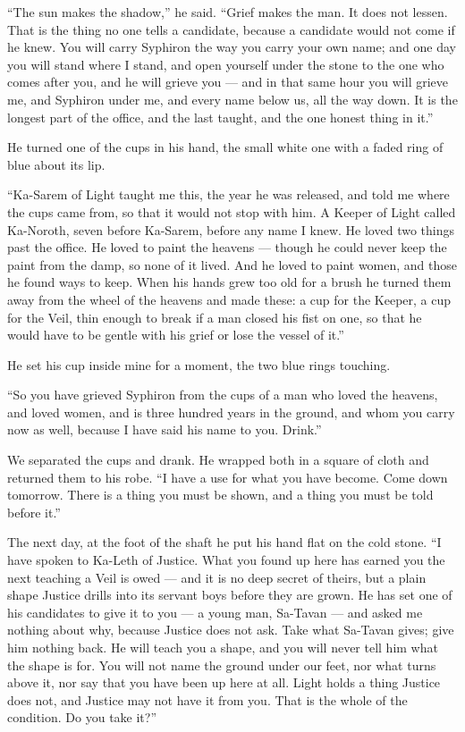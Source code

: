 ``The sun makes the shadow,'' he said. ``Grief makes the man. It does not lessen. That is the thing no one tells a candidate, because a candidate would not come if he knew. You will carry Syphiron the way you carry your own name; and one day you will stand where I stand, and open yourself under the stone to the one who comes after you, and he will grieve you --- and in that same hour you will grieve me, and Syphiron under me, and every name below us, all the way down. It is the longest part of the office, and the last taught, and the one honest thing in it.''\par

He turned one of the cups in his hand, the small white one with a faded ring of blue about its lip.\par

``Ka-Sarem of Light taught me this, the year he was released, and told me where the cups came from, so that it would not stop with him. A Keeper of Light called Ka-Noroth, seven before Ka-Sarem, before any name I knew. He loved two things past the office. He loved to paint the heavens --- though he could never keep the paint from the damp, so none of it lived. And he loved to paint women, and those he found ways to keep. When his hands grew too old for a brush he turned them away from the wheel of the heavens and made these: a cup for the Keeper, a cup for the Veil, thin enough to break if a man closed his fist on one, so that he would have to be gentle with his grief or lose the vessel of it.''\par

He set his cup inside mine for a moment, the two blue rings touching.\par

``So you have grieved Syphiron from the cups of a man who loved the heavens, and loved women, and is three hundred years in the ground, and whom you carry now as well, because I have said his name to you. Drink.''\par

We separated the cups and drank. He wrapped both in a square of cloth and returned them to his robe. ``I have a use for what you have become. Come down tomorrow. There is a thing you must be shown, and a thing you must be told before it.''\par

The next day, at the foot of the shaft he put his hand flat on the cold stone. ``I have spoken to Ka-Leth of Justice. What you found up here has earned you the next teaching a Veil is owed --- and it is no deep secret of theirs, but a plain shape Justice drills into its servant boys before they are grown. He has set one of his candidates to give it to you --- a young man, Sa-Tavan --- and asked me nothing about why, because Justice does not ask. Take what Sa-Tavan gives; give him nothing back. He will teach you a shape, and you will never tell him what the shape is for. You will not name the ground under our feet, nor what turns above it, nor say that you have been up here at all. Light holds a thing Justice does not, and Justice may not have it from you. That is the whole of the condition. Do you take it?''\par

